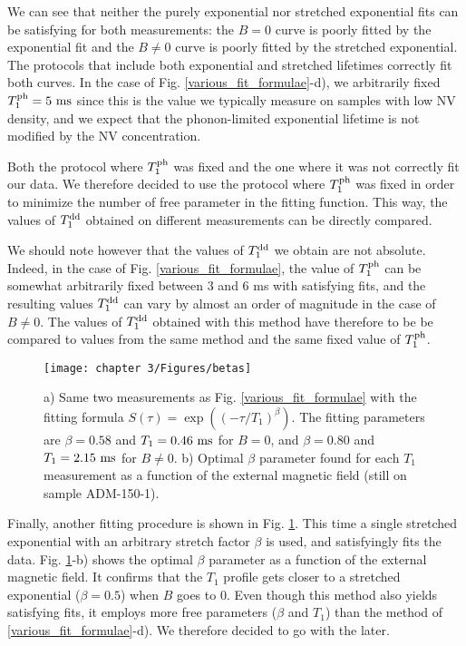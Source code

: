 \documentclass[a4paper, 11pt]{report}
\begin{document}
We can see that neither the purely exponential nor stretched exponential fits can be satisfying for both measurements: the $B=0$ curve is poorly fitted by the exponential fit and the $B \neq 0$ curve is poorly fitted by the stretched exponential. The protocols that include both exponential and stretched lifetimes correctly fit both curves. In the case of Fig. \ref{various_fit_formulae}-d), we arbitrarily fixed $T_1^{\rm ph}=5\ \rm ms$ since this is the value we typically measure on samples with low NV density, and we expect that the phonon-limited exponential lifetime is not modified by the NV concentration.

Both the protocol where $T_1^{\rm ph}$ was fixed and the one where it was not correctly fit our data. We therefore decided to use the protocol where $T_1^{\rm ph}$ was fixed in order to minimize the number of free parameter in the fitting function. This way, the values of $T_1^{\rm dd}$ obtained on different measurements can be directly compared. 

We should note however that the values of $T_1^{\rm dd}$ we obtain are not absolute. Indeed, in the case of Fig. \ref{various_fit_formulae}, the value of $T_1^{\rm ph}$ can be somewhat arbitrarily fixed between 3 and 6 ms with satisfying fits, and the resulting values $T_1^{\rm dd}$ can vary by almost an order of magnitude in the case of $B\neq0$. The values of $T_1^{\rm dd}$ obtained with this method have therefore to be be compared to values from the same method and the same fixed value of $T_1^{\rm ph}$.

\begin{figure}[h]
\centering
\texttt{[image: chapter 3/Figures/betas]}
\caption{a) Same two measurements as Fig. \ref{various_fit_formulae} with the fitting formula $S(\tau)=\exp ((-\tau/T_1)^{\beta})$. The fitting parameters are $\beta=0.58$ and $T_1=0.46\ \rm ms$ for $B=0$, and $\beta=0.80$ and $T_1=2.15\ \rm ms$ for $B\neq0$. b) Optimal $\beta$ parameter found for each $T_1$ measurement as a function of the external magnetic field (still on sample ADM-150-1).}
\label{betas}
\end{figure}

Finally, another fitting procedure is shown in Fig. \ref{betas}. This time a single stretched exponential with an arbitrary stretch factor $\beta$ is used, and satisfyingly fits the data. Fig. \ref{betas}-b) shows the optimal $\beta$ parameter as a function of the external magnetic field. It confirms that the $T_1$ profile gets closer to a stretched exponential ($\beta=0.5$) when $B$ goes to 0. Even though this method also yields satisfying fits, it employs more free parameters ($\beta$ and $T_1$) than the method of \ref{various_fit_formulae}-d). We therefore decided to go with the later.
\end{document}
